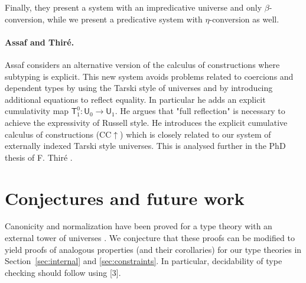 \documentclass[11pt,a4paper]{article}
\theoremstyle{definition}
\newcommand{\UU}{\mathsf{U}}
\newcommand{\T}{\mathsf{T}}
\begin{document}
Finally, they present a system with an impredicative universe and only $\beta$-conversion, while we present a predicative
system with $\eta$-conversion as well.
 

\paragraph{Assaf and Thir\'e.} 

Assaf \cite{Assaf14} considers an alternative version of the calculus of
constructions where subtyping is explicit. This new system avoids problems related to coercions and dependent types by using the Tarski style
of universes and by introducing additional equations to reflect equality. In particular he adds an explicit cumulativity map $\T^0_1 : \UU_0 \to \UU_1$. He argues that "full reflection" is necessary to achieve the expressivity of Russell style. He introduces the explicit cumulative calculus of constructions (CC$\uparrow$) which is closely related to our system of externally indexed Tarski style universes.
This is analysed further in the PhD thesis of F. Thir\'e \cite{Thire20}.

\section{Conjectures and future work}\label{sec:future}

Canonicity and normalization have been proved for a type theory with an external tower of universes \cite{coquand:tcs2019}. We conjecture that these proofs can be modified to yield proofs of analogous properties (and their corollaries) for our type theories in Section~\ref{sec:internal} and \ref{sec:constraints}.
%
In particular, decidability of type checking should follow using [3].
\end{document}
